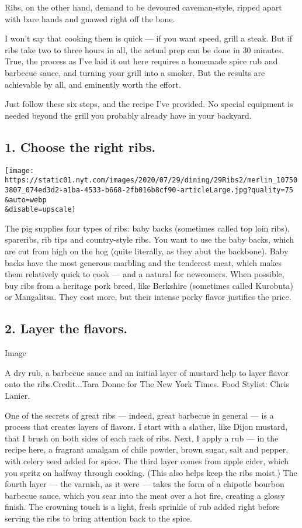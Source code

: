 Ribs, on the other hand, demand to be devoured caveman-style, ripped
apart with bare hands and gnawed right off the bone.

I won't say that cooking them is quick --- if you want speed, grill a
steak. But if ribs take two to three hours in all, the actual prep can
be done in 30 minutes. True, the process as I've laid it out here
requires a homemade spice rub and barbecue sauce, and turning your grill
into a smoker. But the results are achievable by all, and eminently
worth the effort.

Just follow these six steps, and the recipe I've provided. No special
equipment is needed beyond the grill you probably already have in your
backyard.

\hypertarget{1-choose-the-right-ribs}{%
\subsection{1. Choose the right ribs.}\label{1-choose-the-right-ribs}}

\texttt{[image: https://static01.nyt.com/images/2020/07/29/dining/29Ribs2/merlin\_107503807\_074ed3d2-a1ba-4533-b668-2fb016b8cf90-articleLarge.jpg?quality=75\\\&auto=webp\\\&disable=upscale]}

The pig supplies four types of ribs: baby backs (sometimes called top
loin ribs), spareribs, rib tips and country-style ribs. You want to use
the baby backs, which are cut from high on the hog (quite literally, as
they abut the backbone). Baby backs have the most generous marbling and
the tenderest meat, which makes them relatively quick to cook --- and a
natural for newcomers. When possible, buy ribs from a heritage pork
breed, like Berkshire (sometimes called Kurobuta) or Mangalitsa. They
cost more, but their intense porky flavor justifies the price.

\hypertarget{2-layer-the-flavors}{%
\subsection{2. Layer the flavors.}\label{2-layer-the-flavors}}

Image

A dry rub, a barbecue sauce and an initial layer of mustard help to
layer flavor onto the ribs.Credit...Tara Donne for The New York Times.
Food Stylist: Chris Lanier.

One of the secrets of great ribs --- indeed, great barbecue in general
--- is a process that creates layers of flavors. I start with a slather,
like Dijon mustard, that I brush on both sides of each rack of ribs.
Next, I apply a rub --- in the recipe here, a fragrant amalgam of chile
powder, brown sugar, salt and pepper, with celery seed added for spice.
The third layer comes from apple cider, which you spritz on halfway
through cooking. (This also helps keep the ribs moist.) The fourth layer
--- the varnish, as it were --- takes the form of a chipotle bourbon
barbecue sauce, which you sear into the meat over a hot fire, creating a
glossy finish. The crowning touch is a light, fresh sprinkle of rub
added right before serving the ribs to bring attention back to the
spice.

